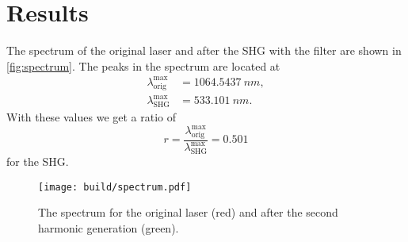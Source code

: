 \section{Results}
\label{sec:results}
The spectrum of the original laser and after the SHG with the filter are shown in
\autoref{fig:spectrum}. The peaks in the spectrum are located at
\begin{align}
  \lambda^\text{max}_\text{orig} &= \SI{1064.5437}{nm}, \\
  \lambda^\text{max}_\text{SHG} &= \SI{533.101}{nm}. 
\end{align}
With these values we get a ratio of
\begin{equation}
  r = \frac{\lambda^\text{max}_\text{orig}}{\lambda^\text{max}_\text{SHG}} 
    = 0.501
    \label{eqn:ratio}
\end{equation}
for the SHG.

\begin{figure*}
  \centering
  \texttt{[image: build/spectrum.pdf]}
  \caption{The spectrum for the original laser (red) and after the second harmonic generation
  (green).}
  \label{fig:spectrum}
\end{figure*}

